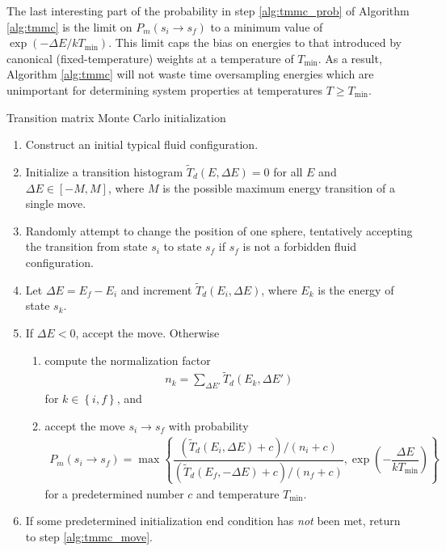 \documentclass[11pt]{article}
\renewcommand{\t}{\text} %
\newcommand{\f}[2]{\dfrac{#1}{#2}} %
\newcommand{\p}[1]{\left(#1\right)} %
\renewcommand{\sp}[1]{\left[#1\right]} %
\renewcommand{\set}[1]{\left\{#1\right\}} %
\newenvironment{alg}
{\hrulefill\begin{enumerate}}
{\end{enumerate}\hrulefill}
\begin{document}
The last interesting part of the probability in step
\ref{alg:tmmc_prob} of Algorithm \ref{alg:tmmc} is the limit on
$P_m\p{s_i\to s_f}$ to a minimum value of $\exp\p{-\Delta
  E/kT_{\t{min}}}$. This limit caps the bias on energies to that
introduced by canonical (fixed-temperature) weights at a temperature
of $T_{\t{min}}$. As a result, Algorithm \ref{alg:tmmc} will not waste
time oversampling energies which are unimportant for determining
system properties at temperatures $T\ge T_{\t{min}}$.

\begin{algorithm}[tb]
  \caption{Transition matrix Monte Carlo initialization}
  \label{alg:tmmc}
  \begin{alg}

  \item Construct an initial typical fluid configuration.

  \item Initialize a transition histogram $\tilde T_d\p{E,\Delta E}=0$
    for all $E$ and $\Delta E\in\sp{-M,M}$, where $M$ is the possible
    maximum energy transition of a single move.

  \item Randomly attempt to change the position of one sphere,
    tentatively accepting the transition from state $s_i$ to state
    $s_f$ if $s_f$ is not a forbidden fluid configuration.
    \label{alg:tmmc_move}

  \item Let $\Delta E=E_f-E_i$ and increment $\tilde
    T_d\p{E_i,\Delta{E}}$, where $E_k$ is the energy of state $s_k$.

  \item If $\Delta E<0$, accept the move. Otherwise
    \begin{enumerate}
    \item compute the normalization factor
      \begin{align*}
        n_k=\sum_{\Delta E'}\tilde T_d\p{E_k,\Delta E'}
      \end{align*}
      for $k\in\set{i,f}$, and

    \item accept the move $s_i\to s_f$ with probability
      \begin{align*}
        P_m\p{s_i\to s_f}
        =\max\set{\f{\p{\tilde T_d\p{E_i,\Delta E}+c}/\p{n_i+c}}
          {\p{\tilde T_d\p{E_f,-\Delta E}+c}/\p{n_f+c}},
          \exp\p{-\f{\Delta E}{kT_{\t{min}}}}}
      \end{align*}
      for a predetermined number $c$ and temperature $T_{\t{min}}$.
      \label{alg:tmmc_prob}
    \end{enumerate}

  \item If some predetermined initialization end condition has
    \emph{not} been met, return to step \ref{alg:tmmc_move}.

  \end{alg}
\end{algorithm}
\end{document}
